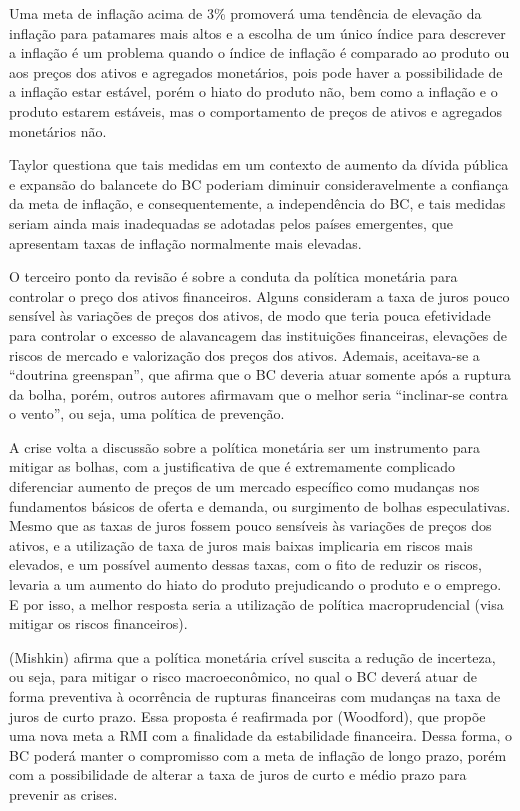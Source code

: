 \documentclass[report]{uftex}
\begin{document}
Uma meta de inflação acima de 3\% promoverá uma tendência de elevação da inflação para patamares mais altos e a escolha de um único índice para descrever a inflação é um problema quando o índice de inflação é comparado ao produto ou aos preços dos ativos e agregados monetários, pois pode haver a possibilidade de a inflação estar estável, porém o hiato do produto não, bem como a inflação e o produto estarem estáveis, mas o comportamento de preços de ativos e agregados monetários não. 

Taylor questiona que tais medidas em um contexto de aumento da dívida pública e expansão do balancete do BC poderiam diminuir consideravelmente a confiança da meta de inflação, e consequentemente, a independência do BC, e tais medidas seriam ainda mais inadequadas se adotadas pelos países emergentes, que apresentam taxas de inflação normalmente mais elevadas. 

O terceiro ponto da revisão é sobre a conduta da política monetária para controlar o preço dos ativos financeiros. Alguns consideram a taxa de juros pouco sensível às variações de preços dos ativos, de modo que teria pouca efetividade para controlar o excesso de alavancagem das instituições financeiras, elevações de riscos de mercado e valorização dos preços dos ativos. Ademais, aceitava-se a ``doutrina greenspan”, que afirma que o BC deveria atuar somente após a ruptura da bolha, porém, outros autores afirmavam que o melhor seria ``inclinar-se contra o vento”, ou seja, uma política de prevenção. 

A crise volta a discussão sobre a política monetária ser um instrumento para mitigar as bolhas, com a justificativa de que é extremamente complicado diferenciar aumento de preços de um mercado específico como mudanças nos fundamentos básicos de oferta e demanda, ou surgimento de bolhas especulativas. Mesmo que as taxas de juros fossem pouco sensíveis às variações de preços dos ativos, e a utilização de taxa de juros mais baixas implicaria em riscos mais elevados, e um possível aumento dessas taxas, com o fito de reduzir os riscos, levaria a um aumento do hiato do produto prejudicando o produto e o emprego. E por isso, a melhor resposta seria a utilização de política macroprudencial (visa mitigar os riscos financeiros). 

(Mishkin) afirma que a política monetária crível suscita a redução de incerteza, ou seja, para mitigar o risco macroeconômico, no qual o BC deverá atuar de forma preventiva à ocorrência de rupturas financeiras com mudanças na taxa de juros de curto prazo. Essa proposta é reafirmada por (Woodford), que propõe uma nova meta a RMI com a finalidade da estabilidade financeira. Dessa forma, o BC poderá manter o compromisso com a meta de inflação de longo prazo, porém com a possibilidade de alterar a taxa de juros de curto e médio prazo para prevenir as crises.
\end{document}
